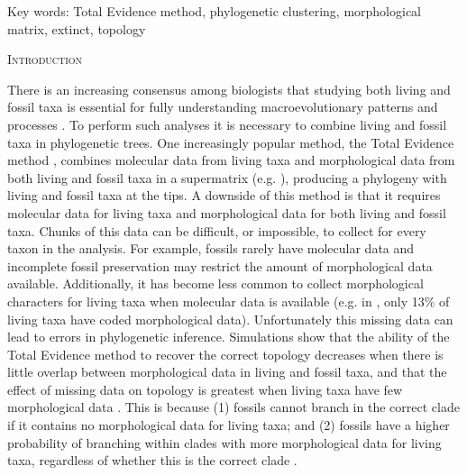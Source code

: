 \documentclass[12pt,letterpaper]{article}
\renewcommand{\section}[1]{%
\bigskip
\begin{center}
\begin{Large}
\normalfont\scshape #1
\medskip
\end{Large}
\end{center}}
\begin{document}
\noindent Key words: Total Evidence method, phylogenetic clustering, morphological matrix, extinct, topology\\

\vspace{1.5in}

%
%
\newpage 
\section{Introduction}

There is an increasing consensus among biologists that studying both living and fossil taxa is essential for fully understanding macroevolutionary patterns and processes \cite{slaterunifying2013,fritzdiversity2013}.
To perform such analyses it is necessary to combine living and fossil taxa in phylogenetic trees.
One increasingly popular method, the Total Evidence method \cite{eernissetaxonomic1993,ronquista2012}, combines molecular data from living taxa and morphological data from both living and fossil taxa in a supermatrix (e.g. \cite{pyrondivergence2011,ronquista2012,schragocombining2013,slaterunifying2013,beckancient2014}), producing a phylogeny with living and fossil taxa at the tips. 
A downside of this method is that it requires molecular data for living taxa and morphological data for both living and fossil taxa.
Chunks of this data can be difficult, or impossible, to collect for every taxon in the analysis.
For example, fossils rarely have molecular data and incomplete fossil preservation may restrict the amount of morphological data available.
Additionally, it has become less common to collect morphological characters for living taxa when molecular data is available (e.g. in \cite{slaterphylogenetic2013}, only 13\% of living taxa have coded morphological data).
Unfortunately this missing data can lead to errors in phylogenetic inference.
Simulations show that the ability of the Total Evidence method to recover the correct topology decreases when there is little overlap between morphological data in living and fossil taxa, and that the effect of missing data on topology is greatest when living taxa have few morphological data \cite{GuillermeCooper}.
This is because (1) fossils cannot branch in the correct clade if it contains no morphological data for living taxa; and (2) fossils have a higher probability of branching within clades with more morphological data for living taxa, regardless of whether this is the correct clade \cite{GuillermeCooper}. 
\end{document}

